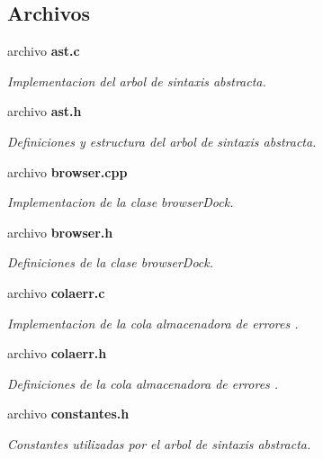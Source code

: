 \subsection*{Archivos}
\begin{CompactItemize}
\item 
archivo {\bf ast.c}
\begin{CompactList}\small\item\em Implementacion del arbol de sintaxis abstracta. \item\end{CompactList}

\item 
archivo {\bf ast.h}
\begin{CompactList}\small\item\em Definiciones y estructura del arbol de sintaxis abstracta. \item\end{CompactList}

\item 
archivo {\bf browser.cpp}
\begin{CompactList}\small\item\em Implementacion de la clase browser\-Dock. \item\end{CompactList}

\item 
archivo {\bf browser.h}
\begin{CompactList}\small\item\em Definiciones de la clase browser\-Dock. \item\end{CompactList}

\item 
archivo {\bf colaerr.c}
\begin{CompactList}\small\item\em Implementacion de la cola almacenadora de errores . \item\end{CompactList}

\item 
archivo {\bf colaerr.h}
\begin{CompactList}\small\item\em Definiciones de la cola almacenadora de errores . \item\end{CompactList}

\item 
archivo {\bf constantes.h}
\begin{CompactList}\small\item\em Constantes utilizadas por el arbol de sintaxis abstracta. \item\end{CompactList}


\end{CompactItemize}
